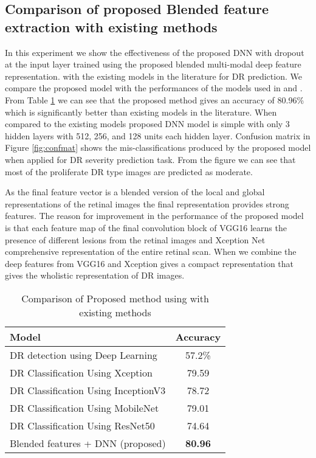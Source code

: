 \documentclass[electronics,article,accept ,moreauthors,pdftex]{mdpi}
\begin{document}
\subsection{Comparison of proposed Blended feature extraction with existing methods}
In this experiment we show the effectiveness of  the proposed DNN with dropout at the input layer trained using the proposed blended multi-modal deep feature representation.   with the existing models in the literature for DR prediction. We compare the proposed model with the performances of the models used in \cite{gargeya2017automated} and \cite{kassani2019diabetic}. From Table  \ref{tab:result_multi_xception_vgg16pool} we can see that the proposed method gives an  accuracy of 80.96\% which is significantly better than existing models in the literature. 
When compared to the existing models proposed DNN model is simple with only 3 hidden layers with 512, 256, and 128 units each hidden layer. 
Confusion matrix in Figure \ref{fig:confmat}  shows the mis-classifications produced by the proposed model when applied for DR severity prediction task. From the figure we can see that most of the proliferate DR type images are  predicted as moderate.    

As the final feature vector is a blended version of the local and global representations of the retinal images the final representation provides strong features. The reason for improvement in the performance of the proposed model is that each feature map of the final convolution block of VGG16 learns the presence of different lesions from the retinal images and  Xception Net  comprehensive representation of the entire retinal scan. When we combine the deep features from VGG16 and Xception gives a compact representation that gives the wholistic representation of DR images.  

\begin{table}[H]
    \begin{center}\caption{Comparison of Proposed method using with existing methods} \renewcommand{\arraystretch}{1.5}        \begin{tabular}{|l|c|} \hline
            \textbf{Model} &  \textbf{ Accuracy} 
            \\ \hline
            DR detection using Deep Learning \cite{gargeya2017automated} & 57.2\% \\ \hline
            DR Classification Using Xception \cite{kassani2019diabetic} & 79.59      \\ \hline
            DR Classification Using InceptionV3 \cite{kassani2019diabetic}& 78.72       \\ \hline
            DR Classification Using MobileNet \cite{kassani2019diabetic}& 79.01      \\ \hline
            DR Classification Using ResNet50 \cite{kassani2019diabetic}& 74.64     \\ \hline
            Blended features + DNN (proposed) & \textbf{80.96}     \\ \hline
        \end{tabular}    
        \label{tab:result_multi_xception_vgg16pool}
    \end{center}
\end{table}
\end{document}
